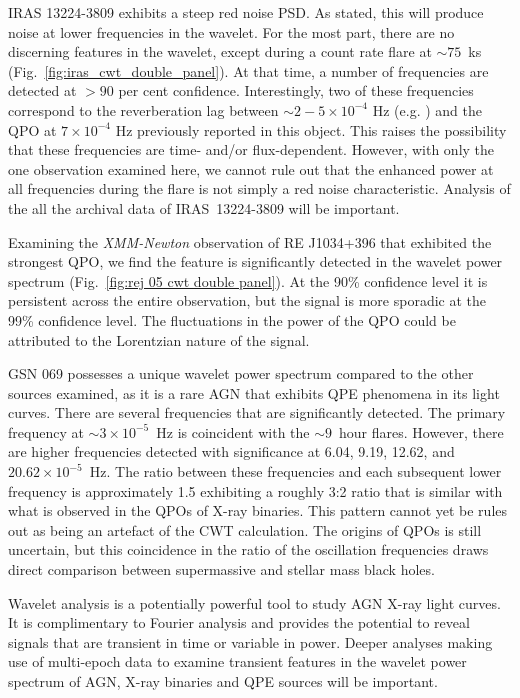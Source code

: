 \documentclass[fleqn,usenatbib]{mnras}
\begin{document}
IRAS 13224-3809 exhibits a steep red noise PSD.  As stated, this will produce noise at lower frequencies in the wavelet.  For the most part, there are no discerning features in the wavelet, except during a count rate flare at $\sim 75$~ks (Fig.~\ref{fig:iras_cwt_double_panel}).  At that time, a number of frequencies are detected at $>90$ per cent confidence.  Interestingly, two of these frequencies correspond to the reverberation lag between $\sim 2 - 5 \times 10^{-4}$ Hz (e.g. \citealt{fabian2013_iras_lag, kara2013_iras_reverberation_lag, alston2019remarkable}) and the QPO at $7 \times 10^{-4}$ Hz \citep{alston2019remarkable} previously reported in this object.  This raises the possibility that these frequencies are time- and/or flux-dependent.  However, with only the one observation examined here, we cannot rule out that the enhanced power at all frequencies during the flare is not simply a red noise characteristic.  Analysis of the all the archival data of IRAS~13224-3809 will be important.

Examining the \textit{XMM-Newton} observation of RE J1034+396 that exhibited the strongest QPO, we find the feature is significantly detected in the wavelet power spectrum (Fig.~\ref{fig:rej 05 cwt double panel}).  At the 90\% confidence level it is persistent across the entire observation, but the signal is more sporadic at the 99\% confidence level. The fluctuations in the power of the QPO could be attributed to the Lorentzian nature of the signal.

GSN 069 possesses a unique wavelet power spectrum compared to the other sources examined, as it is a rare AGN that exhibits QPE phenomena in its light curves. There are several frequencies that are significantly detected.  The primary frequency at $\sim 3\times10^{-5}$~Hz is coincident with the $\sim9$~hour flares.  However, there are higher frequencies detected with significance at 6.04, 9.19, 12.62, and $20.62\times10^{-5}$~Hz.  The ratio between these frequencies and each subsequent lower frequency is approximately 1.5 exhibiting a roughly 3:2 ratio that is similar with what is observed in the QPOs of X-ray binaries.
This pattern cannot yet be rules out as being an artefact of the CWT calculation. The origins of QPOs is still uncertain, but this coincidence in the ratio of the oscillation frequencies draws direct comparison between supermassive and stellar mass black holes.


Wavelet analysis is a potentially powerful tool to study AGN X-ray light curves. It is complimentary to Fourier analysis and provides the potential to reveal signals that are transient in time or variable in power.  Deeper analyses making use of multi-epoch data to examine transient features in the wavelet power spectrum of AGN, X-ray binaries and QPE sources will be important.
\end{document}
